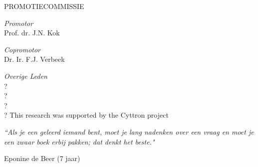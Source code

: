 \documentclass[11pt, a4paper, oneside]{Thesis} %
\begin{document}
\begin{titlepage}
PROMOTIECOMMISSIE

\textit{Promotor}\\
Prof. dr. J.N. Kok

\textit{Copromotor}\\
Dr. Ir. F.J. Verbeek

\textit{Overige Leden}\\
?\\
?\\
?\\
?
\vfill
This research was supported by the Cyttron project
\end{titlepage}




\pagestyle{empty} %





\pagestyle{empty} %

\null\vfill %

\textit{``Als je een geleerd iemand bent, moet je lang nadenken over een vraag en moet je een zwaar boek erbij pakken; dat denkt het beste."}

\begin{flushright}
Eponine de Beer (7 jaar)
\end{flushright}

\vfill\vfill\vfill\vfill\vfill\vfill\null %

\clearpage %

\end{document}
